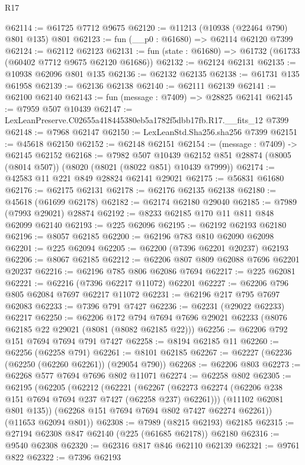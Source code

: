 \begin{lexlean}{R17}
\begin{coremodule}
@62114 := @61725 @7712 @9675
@62120 := @11213 (@10938 (@22464 @790) @801 @135) @801
@62123 := fun (__p0 : @61680) => @62114 @62120 @7399
@62124 := @62112 @62123
@62131 := fun (state : @61680) => @61732 (@61733 (@60402 @7712 @9675 @62120 @61686))
@62132 := @62124 @62131
@62135 := @10938 @62096 @801 @135
@62136 := @62132 @62135
@62138 := @61731 @135 @61958
@62139 := @62136 @62138
@62140 := @62111 @62139
@62141 := @62100 @62140
@62143 := fun (message : @7409) => @28825 @62141
@62145 := @7959 @507 @10439
@62147 := LexLeanPreserve.C02655a418445380eb5a1782f5dbb17fb.R17.__fits_12 @7399
@62148 := @7968 @62147
@62150 := LexLeanStd.Sha256.sha256 @7399
@62151 := @45618 @62150
@62152 := @62148 @62151
@62154 := (message : @7409) -> @62145 @62152
@62168 := @7982
    @507
    @10439
    @62152
    @851
    @28874
    (@8005 (@8014 @507))
    (@8020 (@8021 (@8022 @851) @10439 @7999))
@62174 := @42583 @11 @221 @849 @28824 @62141 @29021
@62175 := @56831 @61680
@62176 := @62175 @62131
@62178 := @62176 @62135 @62138
@62180 := @45618 (@61699 @62178)
@62182 := @62174 @62180 @29040
@62185 := @7989 (@7993 @29021) @28874
@62192 := @8233 @62185 @170 @11 @811 @848 @62099 @62140
@62193 := @225 @62096
@62195 := @62192 @62193 @62180
@62196 := @8057 @62185
@62200 := @62196 @783 @810 @62090 @62098
@62201 := @225 @62094
@62205 := @62200 (@7396 @62201 @20237) @62193
@62206 := @8067 @62185
@62212 := @62206 @807 @809 @62088 @7696 @62201 @20237
@62216 := @62196 @785 @806 @62086 @7694
@62217 := @225 @62081
@62221 := @62216 (@7396 @62217 @11072) @62201
@62227 := @62206 @796 @805 @62084 @7697 @62217 @11072
@62231 := @62196 @217 @795 @7697 @62083
@62233 := @7396 @791 @7427
@62236 := @62231 (@29022 @62233) @62217
@62250 := @62206
    @172
    @794
    @7694
    @7696
    @29021
    @62233
    (@8076 @62185 @22 @29021 (@8081 (@8082 @62185 @22)))
@62256 := @62206 @792 @151 @7694 @7694 @791 @7427
@62258 := @8194 @62185 @11
@62260 := @62256 (@62258 @791)
@62261 := @8101 @62185
@62267 := @62227 (@62236 (@62250 (@62260 @62261)) (@29054 @790))
@62268 := @62206 @803
@62273 := @62268 @577 @7694 @7696 @802 @11071
@62274 := @62258 @802
@62305 := @62195
    (@62205
      (@62212
        (@62221
          (@62267 (@62273 @62274 (@62206 @238 @151 @7694 @7694 @237 @7427 (@62258 @237) @62261)))
          (@11102 @62081 @801 @135))
        (@62268 @151 @7694 @7694 @802 @7427 @62274 @62261))
      (@11653 @62094 @801))
@62308 := @7989 (@8215 @62193) @62185
@62315 := @27194 @62308 @847 @62140 (@225 (@61685 @62178)) @62180
@62316 := @9540 @62308
@62320 := @62316 @817 @846 @62110 @62139
@62321 := @9761 @822
@62322 := @7396 @62193

\end{coremodule}
\end{lexlean}
